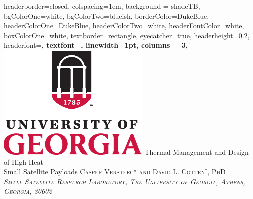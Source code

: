 \documentclass[landscape,archE,fontscale=0.32,columns=3]{Poster} %
\begin{document}
\begin{poster}
{
headerborder=closed, %
colspacing=1em, %
background = shadeTB,
bgColorOne=white, %
bgColorTwo=blueish, %
borderColor=DukeBlue, %
headerColorOne=DukeBlue, %
headerColorTwo=white, %
headerFontColor=white, %
boxColorOne=white, %
textborder=rectangle, %
eyecatcher=true, %
headerheight=0.2\textheight, %
headerfont=\Large\bf\textsc, %
textfont={\setlength{\parindent}{1.5em}}, %
linewidth=1pt, %
columns = 3,
}
%
{\includegraphics[height=15em]{images/UGAlogo.eps}} %
{\fontsize{32}{38.4}\selectfont Thermal Management and Design of High Heat\\ Small Satellite Payloads \vspace{0.5em}} %
{\textsc{Casper Versteeg$^\star$ and David L. Cotten$^\dagger$, PhD \\
\textit{Small Satellite Research Laboratory, The University of Georgia, Athens, Georgia, 30602}}\\ %
}
\end{poster}
\end{document}
